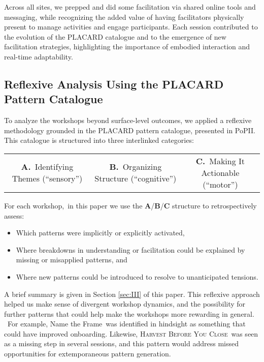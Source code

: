 \documentclass[acmlarge,timestamp]{acmart}
\providecommand{\tightlist}{%
  \setlength{\itemsep}{0pt}\setlength{\parskip}{0pt}}
\begin{document}
{Across all sites, we prepped and did some facilitation via shared
online tools and messaging, while recognizing the added value of having
facilitators physically present to manage activities and engage
participants. Each session contributed to the evolution of the PLACARD
catalogue and to the emergence of new facilitation strategies,
highlighting the importance of embodied interaction and real-time
adaptability.}

\subsection{Reflexive Analysis Using the PLACARD Pattern Catalogue}

To analyze the workshops beyond surface-level outcomes, we applied a
reflexive methodology grounded in the PLACARD pattern catalogue,
presented in PoPII.  This catalogue is structured into three
interlinked categories:

\medskip
\hspace{-.5cm}\begin{tabular}{ccc}
\textbf{A.}~Identifying Themes (“sensory”)&
\textbf{B.}~Organizing Structure (“cognitive”)&
\textbf{C.}~Making It Actionable (“motor”)\\
\end{tabular}

\vspace{.2cm}
For each workshop,~in this paper we use the
\textbf{A}/\textbf{B}/\textbf{C} structure to retrospectively
assess:

\begin{itemize}
\tightlist
\item Which patterns were implicitly or explicitly activated,
\item Where breakdowns in understanding or facilitation could be explained by missing or misapplied patterns, and
\item Where new patterns could be introduced to resolve to unanticipated tensions.
\end{itemize}

A brief summary is given in Section \ref{sec:III} of this paper.  This
reflexive approach helped us make sense of divergent workshop
dynamics, and the possibility for further patterns that could help
make the workshops more rewarding in general. ~For example, Name the
Frame~was identified in hindsight as something that could have
improved onboarding. Likewise, {\scshape {Harvest Before You
    Close}}~was seen as a missing step in several sessions, and this
pattern would address missed opportunities for extemporaneous pattern
generation.
\end{document}
